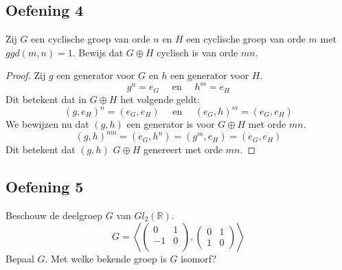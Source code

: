 \documentclass[main.tex]{subfiles}
\begin{document}
\subsection*{Oefening 4}
\label{oza:oz1-oef4}

Zij $G$ een cyclische groep van orde $n$ en $H$ een cyclische groep van orde $m$ met $ggd(m,n)=1$.
Bewijs dat $G \oplus H$ cyclisch is van orde $mn$.

\begin{proof}
  Zij $g$ een generator voor $G$ en $h$ een generator voor $H$.
  \[ g^{n} = e_{G} \quad\text{ en }\quad h^{m} = e_{H} \]
  Dit betekent dat in $G \oplus H$ het volgende geldt:
  \[ (g,e_{H})^{n} = (e_{G},e_{H}) \quad\text{ en }\quad (e_{G},h)^{m} = (e_{G},e_{H}) \]
  We bewijzen nu dat $(g,h)$ een generator is voor $G \oplus H$ met orde $mn$.
  \[ (g,h)^{mn} = (e_{G},h^{n}) = (g^{m},e_{H}) = (e_{G},e_{H}) \]
  Dit betekent dat $(g,h)$ $G \oplus H$ genereert met orde $mn$.
\end{proof}

\subsection*{Oefening 5}
\label{oza:oz1-oef5}

Beschouw de deelgroep $G$ van $Gl_{2}(\mathbb{R})$.
\[
G =
\left<
  \begin{pmatrix}
     0 & 1\\
    -1 & 0\\
  \end{pmatrix}
  ,
  \begin{pmatrix}
    0 & 1\\
    1 & 0
  \end{pmatrix}
\right>
\]
Bepaal $G$.
Met welke bekende groep is $G$ isomorf?
\end{document}
